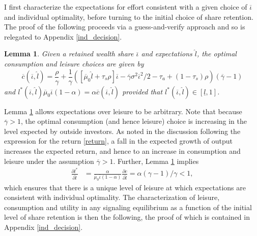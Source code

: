 \documentclass[11pt]{article}
\theoremstyle{plain}
\newtheorem{lemma}[thm]{Lemma}
\begin{document}
I first characterize the expectations for effort consistent with a given choice of $\overline{\iota}$ and individual optimality, before turning to the initial choice of share retention. The proof of the following proceeds via a guess-and-verify approach and so is relegated to Appendix \ref{ind_decision}. 

\begin{lemma} \label{FIXiotal}
Given a retained wealth share $\overline{\iota}$ and expectations $\hat{l}$, the optimal consumption and leisure choices are given by
$$
\overline{c}(\overline{\iota}, \hat{l}) = \frac{\rho}{\gamma} + \frac{1}{\gamma}{\left([\overline{\mu}_0\hat{l} + \tau_s\rho]\overline{\iota} - \overline{\gamma}\sigma^2\overline{\iota}^2/2 - \tau_a + (1-\tau_s)\rho\right)}(\overline{\gamma} - 1) 
$$
and $l^*(\overline{\iota}, \hat{l})\overline{\mu}_0\overline{\iota}(1-\alpha) = \alpha \overline{c}(\overline{\iota}, \hat{l})$
provided that $l^*(\overline{\iota}, \hat{l}) \in [\underline{l}, 1]$. 
\end{lemma}


Lemma \ref{FIXiotal} allows expectations over leisure to be arbitrary. Note that because $\overline{\gamma}>1$, the optimal consumption (and hence leisure) choice is increasing in the level expected by outside investors. As noted in the discussion following the expression for the return \eqref{return}, a fall in the expected growth of output increases the expected return, and hence to an increase in consumption and leisure under the assumption $\overline{\gamma}>1$. Further, Lemma \ref{FIXiotal} implies
\begin{align*} %
\frac{\partial l^*}{\partial \hat{l}} & = \frac{\alpha }{\overline{\mu}_0\overline{\iota}(1-\alpha)} \frac{\partial c}{\partial \hat{l}} = \alpha (\gamma-1) /\gamma < 1, 
\end{align*}
which ensures that there is a unique level of leisure at which expectations are consistent with individual optimality. The characterization of leisure, consumption and utility in any signaling equilibrium as a function of the initial level of share retention is then the following, the proof of which is contained in Appendix \ref{ind_decision}.
\end{document}
